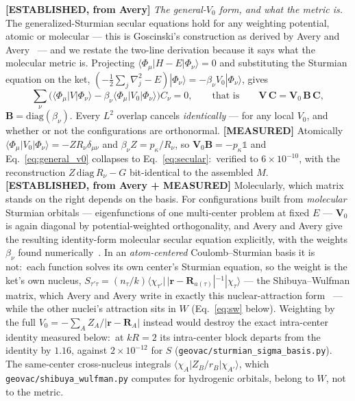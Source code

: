 \documentclass[aps,pra,twocolumn,superscriptaddress,longbibliography]{revtex4-2}
\begin{document}
\textbf{[ESTABLISHED, from Avery]} \emph{The general-$V_0$ form, and what the
metric is.}  The generalized-Sturmian secular equations hold for any weighting
potential, atomic or molecular --- this is Goscinski's construction as
derived by Avery and Avery~\cite{avery2017,goscinski2002} --- and we restate
the two-line derivation because it says what the molecular metric is.  Projecting
$\langle\Phi_\mu|H-E|\Phi_\nu\rangle=0$ and substituting the Sturmian equation on
the ket, $(-\tfrac12\sum_j\nabla_j^{2}-E)|\Phi_\nu\rangle=-\beta_\nu
V_0|\Phi_\nu\rangle$, gives
\begin{equation}
  \sum_\nu\Big(\langle\Phi_\mu|V|\Phi_\nu\rangle-\beta_\nu
    \langle\Phi_\mu|V_0|\Phi_\nu\rangle\Big)C_\nu=0,
  \qquad\text{that is}\qquad
  \mathbf{V}\,\mathbf{C}=\mathbf{V}_0\,\mathbf{B}\,\mathbf{C},
  \label{eq:general_v0}
\end{equation}
$\mathbf{B}=\mathrm{diag}(\beta_\nu)$.  Every $L^{2}$ overlap cancels
\emph{identically} --- for any local $V_0$, and whether or not the configurations
are orthonormal.  \textbf{[MEASURED]} Atomically
$\langle\Phi_\mu|V_0|\Phi_\nu\rangle=-Z R_\nu\delta_{\mu\nu}$ and
$\beta_\nu Z=p_\kappa/R_\nu$, so $\mathbf{V}_0\mathbf{B}=-p_\kappa\mathbb{1}$ and
Eq.~\eqref{eq:general_v0} collapses to Eq.~\eqref{eq:secular}:\ verified to
$6\times10^{-10}$, with the reconstruction $Z\,\mathrm{diag}\,R_\nu-G$
bit-identical to the assembled $M$.  \textbf{[ESTABLISHED, from Avery +
MEASURED]} Molecularly, which matrix stands on the right depends on the basis.
For configurations built from \emph{molecular} Sturmian orbitals --- eigenfunctions
of one multi-center problem at fixed $E$ --- $\mathbf{V}_0$ is again diagonal by
potential-weighted orthogonality, and Avery and Avery give the resulting
identity-form molecular secular equation explicitly, with the weights $\beta_\nu$
found numerically~\cite{avery2017}.  In an \emph{atom-centered} Coulomb--Sturmian
basis it is not:\ each function solves its own center's Sturmian equation, so the
weight is the ket's own nucleus,
$S_{\tau'\tau}=(n_\tau/k)\langle\chi_{\tau'}|\,|\mathbf r-\mathbf R_{a(\tau)}|^{-1}|\chi_\tau\rangle$
--- the Shibuya--Wulfman matrix, which Avery and Avery write in exactly this
nuclear-attraction form~\cite{avery2017} --- while the other nuclei's attraction
sits in $W$ (Eq.~\eqref{eq:sw} below).  Weighting by the full
$V_0=-\sum_A Z_A/|\mathbf r-\mathbf R_A|$ instead would destroy the exact
intra-center identity measured below:\ at $kR=2$ its intra-center block departs
from the identity by $1.16$, against $2\times10^{-12}$ for $S$
(\texttt{geovac/sturmian\_sigma\_basis.py}).  The same-center cross-nucleus
integrals $\langle\chi_A|Z_B/r_B|\chi_{A'}\rangle$, which
\texttt{geovac/shibuya\_wulfman.py} computes for hydrogenic orbitals, belong to
$W$, not to the metric.
\end{document}
